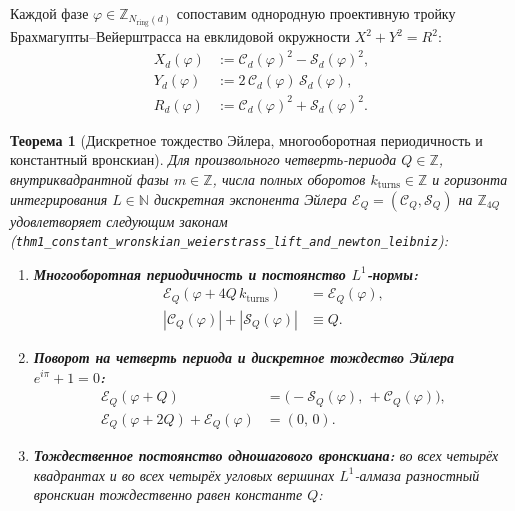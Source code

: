\documentclass[11pt,a4paper]{article}
\theoremstyle{plain}
\newtheorem{theorem}{Теорема}[section]
\theoremstyle{definition}
\begin{document}
Каждой фазе $\varphi \in \mathbb{Z}_{N_{\mathrm{ring}}(d)}$ сопоставим однородную проективную тройку Брахмагупты--Вейерштрасса на евклидовой окружности $X^2 + Y^2 = R^2$:
\begin{align}
  X_d(\varphi) &:= \mathcal{C}_d(\varphi)^2 - \mathcal{S}_d(\varphi)^2, \label{eq:weierstrass-x} \\
  Y_d(\varphi) &:= 2\,\mathcal{C}_d(\varphi)\,\mathcal{S}_d(\varphi), \label{eq:weierstrass-y} \\
  R_d(\varphi) &:= \mathcal{C}_d(\varphi)^2 + \mathcal{S}_d(\varphi)^2. \label{eq:weierstrass-r}
\end{align}

\begin{theorem}[Дискретное тождество Эйлера, многооборотная периодичность и константный вронскиан]
\label{thm:main-1}
Для произвольного четверть-периода $Q \in \mathbb{Z}$, внутриквадрантной фазы $m \in \mathbb{Z}$, числа полных оборотов $k_{\mathrm{turns}} \in \mathbb{Z}$ и горизонта интегрирования $L \in \mathbb{N}$ дискретная экспонента Эйлера $\mathcal{E}_Q = (\mathcal{C}_Q, \mathcal{S}_Q)$ на $\mathbb{Z}_{4Q}$ удовлетворяет следующим законам (\texttt{thm1\_constant\_wronskian\_weierstrass\_lift\_and\_newton\_leibniz}):
\begin{enumerate}[label=\textbf{(\roman*)},leftmargin=*]
\item \textbf{Многооборотная периодичность и постоянство $L^1$-нормы:}
  \begin{align}
    \mathcal{E}_Q(\varphi + 4Q\,k_{\mathrm{turns}}) &= \mathcal{E}_Q(\varphi), \label{eq:rotator-period} \\
    |\mathcal{C}_Q(\varphi)| + |\mathcal{S}_Q(\varphi)| &\equiv Q. \label{eq:rotator-l1}
  \end{align}
\item \textbf{Поворот на четверть периода и дискретное тождество Эйлера $e^{i\pi} + 1 = 0$:}
  \begin{align}
    \mathcal{E}_Q(\varphi + Q) &= \bigl(-\mathcal{S}_Q(\varphi),\, +\mathcal{C}_Q(\varphi)\bigr), \label{eq:rotator-quarter-turn} \\
    \mathcal{E}_Q(\varphi + 2Q) + \mathcal{E}_Q(\varphi) &= (0,\, 0). \label{eq:rotator-euler-identity}
  \end{align}
\item \textbf{Тождественное постоянство одношагового вронскиана:}
  во всех четырёх квадрантах и во всех четырёх угловых вершинах $L^1$-алмаза разностный вронскиан тождественно равен константе $Q$:
  \begin{equation}

\end{equation}
\end{enumerate}
\end{theorem}
\end{document}
